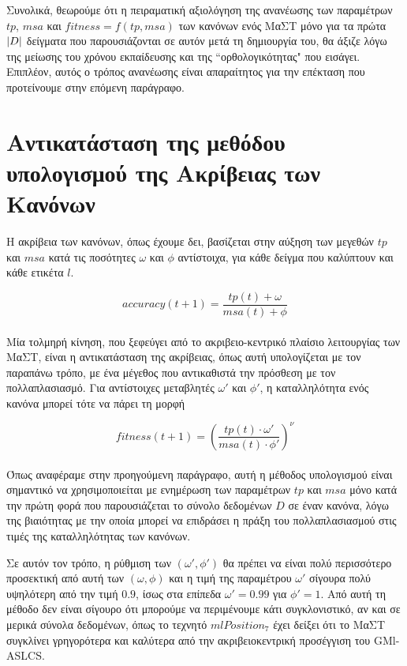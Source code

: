 Συνολικά, θεωρούμε ότι η πειραματική αξιολόγηση της ανανέωσης των παραμέτρων $tp$, $msa$ και $fitness=f(tp, msa)$ των κανόνων ενός ΜαΣΤ μόνο για τα πρώτα $\lvert D\rvert$ δείγματα που παρουσιάζονται σε αυτόν μετά τη δημιουργία του, θα άξιζε λόγω της μείωσης του χρόνου εκπαίδευσης και της “ορθολογικότητας" που εισάγει. Επιπλέον, αυτός ο τρόπος ανανέωσης είναι απαραίτητος για την επέκταση που προτείνουμε στην επόμενη παράγραφο.


\section{Αντικατάσταση της μεθόδου υπολογισμού της Ακρίβειας των Κανόνων}
Η ακρίβεια των κανόνων, όπως έχουμε δει, βασίζεται στην αύξηση των μεγεθών $tp$ και $msa$ κατά τις ποσότητες $\omega$ και $\phi$ αντίστοιχα, για κάθε δείγμα που καλύπτουν και κάθε ετικέτα $l$. 

\begin{equation}
accuracy(t+1) = \dfrac{tp(t) + \omega}{msa(t) + \phi}
\end{equation}
\\

Μία τολμηρή κίνηση, που ξεφεύγει από το ακριβειο-κεντρικό πλαίσιο λειτουργίας των ΜαΣΤ, είναι η αντικατάσταση της ακρίβειας, όπως αυτή υπολογίζεται με τον παραπάνω τρόπο, με ένα μέγεθος που αντικαθιστά την πρόσθεση με τον πολλαπλασιασμό. Για αντίστοιχες μεταβλητές $\omega'$ και $\phi'$, η καταλληλότητα ενός κανόνα μπορεί τότε να πάρει τη μορφή

\begin{equation}
fitness(t+1)  = \left(\dfrac{tp(t) \cdot \omega'}{msa(t) \cdot \phi'}\right)^{\nu}
\end{equation}
\\

Όπως αναφέραμε στην προηγούμενη παράγραφο, αυτή η μέθοδος υπολογισμού είναι σημαντικό να χρησιμοποιείται με ενημέρωση των παραμέτρων $tp$ και $msa$ μόνο κατά την πρώτη φορά που παρουσιάζεται το σύνολο δεδομένων $D$ σε έναν κανόνα, λόγω της βιαιότητας με την οποία μπορεί να επιδράσει η πράξη του πολλαπλασιασμού στις τιμές της καταλληλότητας των κανόνων. 

Σε αυτόν τον τρόπο, η ρύθμιση των $(\omega', \phi')$ θα πρέπει να είναι πολύ περισσότερο προσεκτική από αυτή των $(\omega, \phi)$ και η τιμή της παραμέτρου $\omega'$ σίγουρα πολύ υψηλότερη από την τιμή $0.9$, ίσως στα επίπεδα $\omega'=0.99$ για $\phi'=1$. Από αυτή τη μέθοδο δεν είναι σίγουρο ότι μπορούμε να περιμένουμε κάτι συγκλονιστικό, αν και σε μερικά σύνολα δεδομένων, όπως το τεχνητό $mlPosition_{7}$ έχει δείξει ότι το ΜαΣΤ συγκλίνει γρηγορότερα και καλύτερα από την ακριβειοκεντρική προσέγγιση του GMl-ASLCS. 

